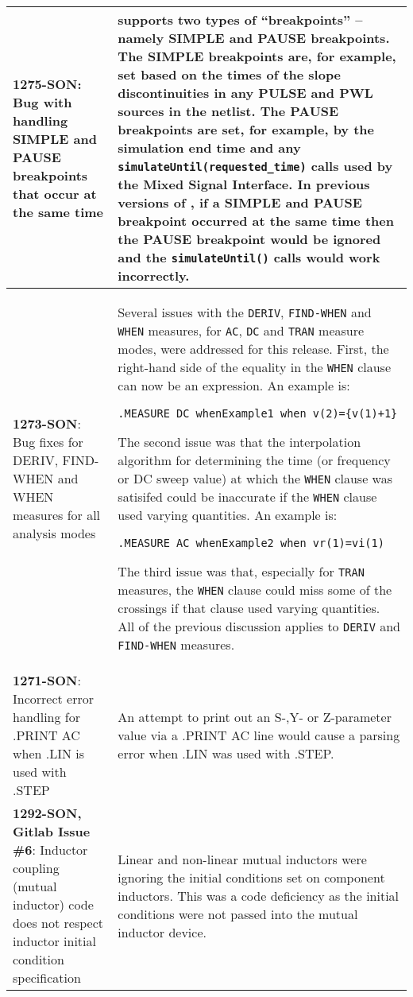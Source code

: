 {\begin{longtable}[h] {>{\raggedright\small}m{2in}|>{\raggedright\let\\\tabularnewline\small}m{3.5in}}
\textbf{1275-SON}: Bug with handling SIMPLE and PAUSE breakpoints that occur at the same time &
\Xyce{} supports two types of ``breakpoints'' -- namely SIMPLE and PAUSE breakpoints.  The SIMPLE
breakpoints are, for example, set based on the times of the slope discontinuities in any PULSE
and PWL sources in the netlist.  The PAUSE breakpoints are set, for example, by the simulation
end time and any \texttt{simulateUntil(requested\_time)} calls used by the Mixed Signal Interface.
In previous versions of \Xyce{}, if a SIMPLE and PAUSE breakpoint occurred at the same time
then the PAUSE breakpoint would be ignored and the \texttt{simulateUntil()} calls would work
incorrectly.
\\ \hline

\textbf{1273-SON}: Bug fixes for DERIV, FIND-WHEN and WHEN measures for all analysis modes &
Several issues with the \texttt{DERIV}, \texttt{FIND-WHEN} and \texttt{WHEN} measures, for \texttt{AC},
\texttt{DC} and \texttt{TRAN} measure modes, were addressed for this release.  First,
the right-hand side of the equality in the \texttt{WHEN} clause can now be an expression.
An example is:
\begin{verbatim}
.MEASURE DC whenExample1 when v(2)={v(1)+1}
\end{verbatim}
The second issue was that the interpolation algorithm for determining the time
(or frequency or DC sweep value) at which the \texttt{WHEN} clause was satisifed
could be inaccurate if the \texttt{WHEN} clause used varying quantities.
An example is:
\begin{verbatim}
.MEASURE AC whenExample2 when vr(1)=vi(1)
\end{verbatim}
The third issue was that, especially for \texttt{TRAN} measures, the \texttt{WHEN}
clause could miss some of the crossings if that clause used varying quantities.  All of
the previous discussion applies to \texttt{DERIV} and \texttt{FIND-WHEN} measures.
\\ \hline

\textbf{1271-SON}: Incorrect error handling for .PRINT AC when .LIN is used with
.STEP & An attempt to print out an S-,Y- or Z-parameter value via a .PRINT AC line
would cause a parsing error when .LIN was used with .STEP.
\\ \hline

\textbf{1292-SON, Gitlab Issue \#6}: Inductor coupling (mutual inductor) code does not respect inductor initial condition specification &
Linear and non-linear mutual inductors were ignoring the initial conditions set on 
component inductors.  This was a code deficiency as the initial conditions were not 
passed into the mutual inductor device.
\\ \hline


\end{longtable}}
